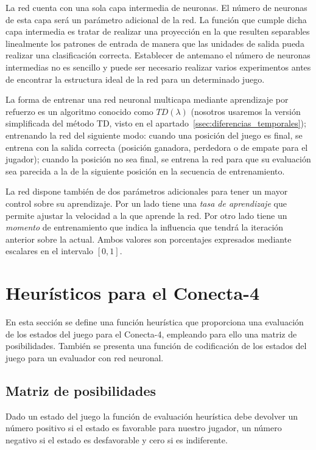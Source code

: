 La red cuenta con una sola capa intermedia de neuronas.
El número de neuronas de esta capa será un parámetro adicional de la red.
La función que cumple dicha capa intermedia es tratar de realizar una proyección en la que resulten separables linealmente los patrones de entrada de manera que las unidades de salida pueda realizar una clasificación correcta.
Establecer de antemano el número de neuronas intermedias no es sencillo y puede ser necesario realizar varios experimentos antes de encontrar la estructura ideal de la red para un determinado juego.

La forma de entrenar una red neuronal multicapa mediante aprendizaje por refuerzo es un algoritmo conocido como $TD(\lambda)$ (nosotros usaremos la versión simplificada del método TD, visto en el apartado~\ref{ssec:diferencias_temporales}); entrenando la red del siguiente modo: cuando una posición del juego es final, se entrena con la salida correcta (posición ganadora, perdedora o de empate para el jugador); cuando la posición no sea final, se entrena la red para que su evaluación sea parecida a la de la siguiente posición en la secuencia de entrenamiento.

La red dispone también de dos parámetros adicionales para tener un mayor control sobre su aprendizaje.
Por un lado tiene una \textit{tasa de aprendizaje} que permite ajustar la velocidad a la que aprende la red.
Por otro lado tiene un \textit{momento} de entrenamiento que indica la influencia que tendrá la iteración anterior sobre la actual.
Ambos valores son porcentajes expresados mediante escalares en el intervalo $[0,1]$.


\section{Heurísticos para el Conecta-4}
\label{sec:heuristicos_conecta4}
En esta sección se define una función heurística que proporciona una evaluación de los estados del juego para el Conecta-4, empleando para ello una matriz de posibilidades.
También se presenta una función de codificación de los estados del juego para un evaluador con red neuronal.

\subsection{Matriz de posibilidades}
\label{ssec:matriz_posibilidades}
Dado un estado del juego la función de evaluación heurística debe devolver un número positivo si el estado es favorable para nuestro jugador, un número negativo si el estado es desfavorable y cero si es indiferente.

